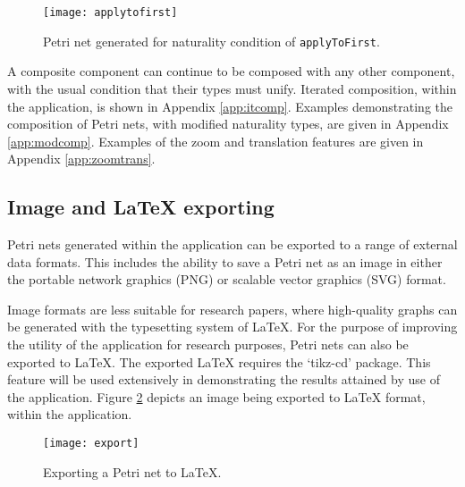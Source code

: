 \documentclass[../Dissertation.tex]{subfiles}
\begin{document}
\begin{figure}[H]
\begin{center}
\texttt{[image: applytofirst]}
\end{center}
\caption{Petri net generated for naturality condition of \lstinline{applyToFirst}.}
\label{fig:applytofirstimg}
\end{figure}

A composite component can continue to be composed with any other component, with the usual condition that their types must unify. Iterated composition, within the application, is shown in Appendix \ref{app:itcomp}. Examples demonstrating the composition of Petri nets, with modified naturality types, are given in Appendix \ref{app:modcomp}. Examples of the zoom and translation features are given in Appendix \ref{app:zoomtrans}.

\subsection{Image and LaTeX exporting}
Petri nets generated within the application can be exported to a range of external data formats. This includes the ability to save a Petri net as an image in either the portable network graphics (PNG) or scalable vector graphics (SVG) format.
\par
Image formats are less suitable for research papers, where high-quality graphs can be generated with the typesetting system of LaTeX. For the purpose of improving the utility of the application for research purposes, Petri nets can also be exported to LaTeX. The exported LaTeX requires the `tikz-cd' package. This feature will be used extensively in demonstrating the results attained by use of the application. Figure \ref{fig:export} depicts an image being exported to LaTeX format, within the application.
\begin{figure}[H]
\begin{center}
\texttt{[image: export]}
\end{center}
\caption{Exporting a Petri net to LaTeX.}
\label{fig:export}
\end{figure}
\end{document}
